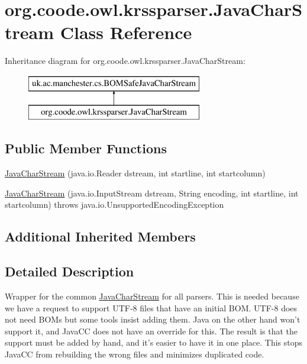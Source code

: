 \hypertarget{classorg_1_1coode_1_1owl_1_1krssparser_1_1_java_char_stream}{\section{org.\-coode.\-owl.\-krssparser.\-Java\-Char\-Stream Class Reference}
\label{classorg_1_1coode_1_1owl_1_1krssparser_1_1_java_char_stream}
}
Inheritance diagram for org.\-coode.\-owl.\-krssparser.\-Java\-Char\-Stream\-:\begin{figure}[H]
\begin{center}
\leavevmode
\includegraphics[height=2.000000cm]{classorg_1_1coode_1_1owl_1_1krssparser_1_1_java_char_stream}
\end{center}
\end{figure}
\subsection*{Public Member Functions}
\begin{DoxyCompactItemize}
\item 
\hyperlink{classorg_1_1coode_1_1owl_1_1krssparser_1_1_java_char_stream_a8bd86773050d44ebe84f918e14db2880}{Java\-Char\-Stream} (java.\-io.\-Reader dstream, int startline, int startcolumn)
\item 
\hyperlink{classorg_1_1coode_1_1owl_1_1krssparser_1_1_java_char_stream_abb7129d9f35d73eb488ab0a00909d33b}{Java\-Char\-Stream} (java.\-io.\-Input\-Stream dstream, String encoding, int startline, int startcolumn)  throws java.\-io.\-Unsupported\-Encoding\-Exception 
\end{DoxyCompactItemize}
\subsection*{Additional Inherited Members}


\subsection{Detailed Description}
Wrapper for the common \hyperlink{classorg_1_1coode_1_1owl_1_1krssparser_1_1_java_char_stream}{Java\-Char\-Stream} for all parsers. This is needed because we have a request to support U\-T\-F-\/8 files that have an initial B\-O\-M. U\-T\-F-\/8 does not need B\-O\-Ms but some tools insist adding them. Java on the other hand won't support it, and Java\-C\-C does not have an override for this. The result is that the support must be added by hand, and it's easier to have it in one place. This stops Java\-C\-C from rebuilding the wrong files and minimizes duplicated code. 

